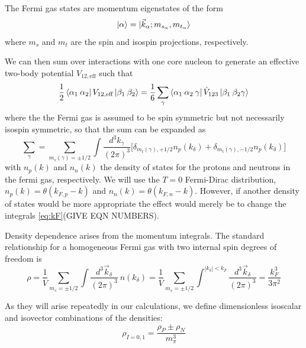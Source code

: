 \documentclass[%
 preprint,
 amsmath,amssymb,
 aps,
]{revtex4-1}
\begin{document}
The Fermi gas states are momentum eigenstates of the form
\begin{equation}
\ket{\alpha}=\ket{\vec{k}_\alpha;m_{s_\alpha},m_{t_\alpha}}
\end{equation}
where $m_s$ and $m_t$ are the spin and isospin projections, respectively. %

We can then sum over interactions with one core nucleon to generate an effective two-body potential $V_{12,\text{eff}}$ such that
\begin{equation}
\frac{1}{2} \bra{\alpha_1\:\alpha_2}  V_{12,\text{eff}}\ket{\beta_1 \:\beta_2 }=\frac{1}{6} \sum_{\gamma} \bra{\alpha_1\:\alpha_2 \: \gamma} \hat{V}_{123}  \ket{\beta_1 \:\beta_2 \gamma}
\end{equation}
where the the Fermi gas is assumed to be spin symmetric but not necessarily isospin symmetric, so that the sum can be expanded as
\begin{equation}
\sum_\gamma=\sum_{m_s(\gamma)=\pm 1/2}\int \frac{d^3k_\gamma}{(2\pi)^3} \Big[\delta_{m_{t}(\gamma),+1/2} n_p(k_\delta) +\delta_{m_{t}(\gamma),-1/2} n_p(k_\delta) \Big]
\end{equation}
with $n_p(k)$ and $n_n(k)$ the density of states for the protons and neutrons in the fermi gas, respectively. We will use the $T=0$ Fermi-Dirac distribution, $n_p(k)=\theta(k_{F,p}-k)$ and $n_n(k)=\theta(k_{F,n}-k)$. However, if another density of states would be more appropriate the effect would merely be to change the integrals \eqref{eq:kF}(GIVE EQN NUMBERS).

Density dependence arises from the momentum integrals. The standard relationship for a homogeneous Fermi gas with two internal spin degrees of freedom is 
\begin{equation}\label{eq:kF}
\rho=\frac{1}{V}\sum_{m_{s}=\pm 1/2}\int \frac{d^3\vec{k}_\delta}{(2\pi)^3}\:n(k_\delta)
=\frac{1}{V}\sum_{m_{s}=\pm 1/2}\int^{|k_\delta|<k_F}\frac{d^3\vec{k}_\delta}{(2\pi)^3}=\frac{k_F^3}{3\pi^2}
\end{equation}

As they will arise repeatedly in our calculations, we define dimensionless isoscalar and isovector combinations of the densities:
\begin{equation}\label{eq:densities}
\rho_{I=0,1}=\frac{\rho_P\pm\rho_N}{m_\pi^3}
\end{equation}
\end{document}
